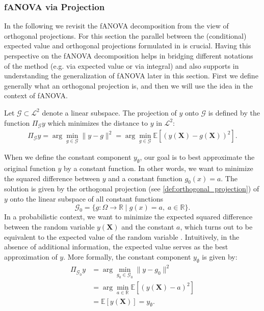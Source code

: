\subsubsection{fANOVA via Projection}
In the following we revisit the fANOVA decomposition from the view of orthogonal projections.
For this section the parallel between the (conditional) expected value and orthogonal projections formulated in \cite{Vaart_1998} is crucial.
Having this perspective on the fANOVA decomposition helps in bridging different notations of the method (e.g. via expected value or via integral) and also supports in understanding the generalization of fANOVA later in this section. First we define generally what an orthogonal projection is, and then we will use the idea in the context of fANOVA.
\begin{definition}\label{def:orthogonal_projection}
    Let $\mathcal{G} \subset \mathcal{L}^2$ denote a linear subspace. The projection of $y$ onto $\mathcal{G}$ is defined by the function $\Pi_{\mathcal{G}}y$ which minimizes the distance to $y$ in $\mathcal{L}^2$:
\begin{align}
    \Pi_{\mathcal{G}}y = \arg\min_{g \in \mathcal{G}} \|y - g\|^2
= \arg\min_{g \in \mathcal{G}} \mathbb{E}[(y(\boldsymbol{X}) - g(\boldsymbol{X}))^2].
\end{align}
\end{definition}
When we define the constant component $y_\emptyset$, our goal is to best 
approximate the original function $y$ by a constant function. 
In other words, we want to minimize the squared difference between $y$ and 
a constant function $g_0(x) = a$. 
The solution is given by the orthogonal projection (see \autoref{def:orthogonal_projection}) 
of $y$ onto the linear subspace of all constant functions 
$$\mathcal{G}_0 = \{ g : \Omega \to \mathbb{R} \mid g(x) = a,\; a \in \mathbb{R} \}.$$
In a probabilistic context, we want to minimize the expected squared difference 
between the random variable $y(\boldsymbol{X})$ and the constant $a$, which turns out to be 
equivalent to the expected value of the random variable \citep{Vaart_1998}.
Intuitively, in the absence of additional information, the expected value serves 
as the best approximation of $y$. 
More formally, the constant component $y_{\emptyset}$ is given by:
\begin{align*}
    \Pi_{\mathcal{G}_0}y
    &= \arg \min_{g_0 \in \mathcal{G}_0} \|y - g_0\|^2 \\ 
    &= \arg \min_{a \in \mathbb{R}} \mathbb{E}[(y(\boldsymbol{X}) - a)^2] \\ 
    &= \mathbb{E}[y(\boldsymbol{X})] = y_{\emptyset}.
\end{align*}
